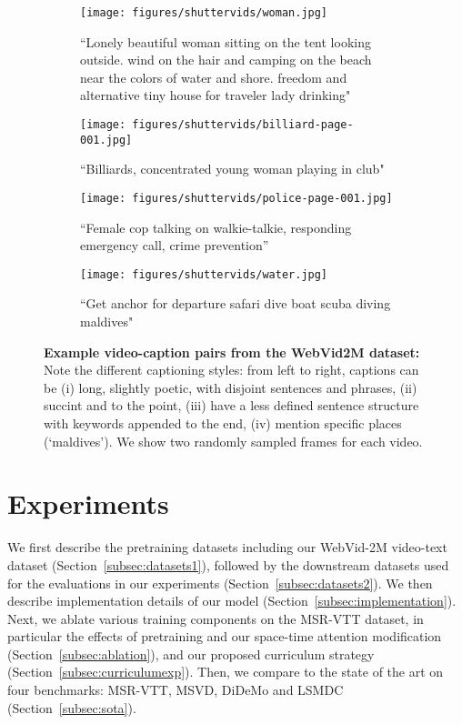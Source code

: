 \documentclass[10pt,twocolumn,letterpaper]{article}
\begin{document}
\begin{figure*}
\captionsetup[subfigure]{labelformat=empty}
     \centering
     \begin{subfigure}[t]{0.23\textwidth}
         \centering
         \texttt{[image: figures/shuttervids/woman.jpg]}
         \caption{\footnotesize{``Lonely beautiful woman sitting on the tent looking outside. wind on the hair and camping on the beach near the colors of water and shore. freedom and alternative tiny house for traveler lady drinking"}}
     \end{subfigure}
     \hfill
     \begin{subfigure}[t]{0.23\textwidth}
         \centering
\texttt{[image: figures/shuttervids/billiard-page-001.jpg]}
         \caption{\footnotesize{``Billiards, concentrated young woman playing in club"}}
     \end{subfigure}
     \hfill
     \begin{subfigure}[t]{0.23\textwidth}
         \centering
         \texttt{[image: figures/shuttervids/police-page-001.jpg]}
         \caption{\footnotesize{``Female cop talking on walkie-talkie, responding emergency call, crime prevention''}}
     \end{subfigure}
     \hfill
    \begin{subfigure}[t]{0.23\textwidth}
         \centering
         \texttt{[image: figures/shuttervids/water.jpg]}
         \caption{\footnotesize{``Get anchor for departure safari dive boat scuba diving maldives"}}
     \end{subfigure}
     \hfill
                  \caption{\textbf{Example video-caption pairs from the WebVid2M dataset:} Note the different captioning styles: from left to right, captions can be (i) long, slightly poetic, with disjoint sentences and phrases, (ii) succint and to the point, (iii) have a less defined sentence structure with keywords appended to the end, (iv) mention specific places (`maldives'). We show two randomly sampled frames for each video.}

        \label{fig:webvid2m}
\end{figure*} \section{Experiments}
We first describe the pretraining datasets including our WebVid-2M video-text dataset 
(Section~\ref{subsec:datasets1}), followed by the downstream datasets used for the evaluations
in our experiments (Section~\ref{subsec:datasets2}).
We then describe implementation details of our model (Section~\ref{subsec:implementation}).
Next, we ablate various training components on the MSR-VTT dataset,
in particular the effects of pretraining and our space-time attention modification (Section~\ref{subsec:ablation}),
and our proposed curriculum strategy (Section~\ref{subsec:curriculumexp}).
Then, we compare to the state of the art on
four benchmarks: MSR-VTT, MSVD, DiDeMo and LSMDC (Section~\ref{subsec:sota}).
\end{document}
